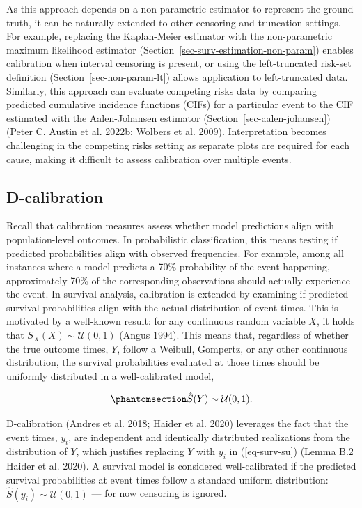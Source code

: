 \documentclass[
  letterpaper,
  krantz2]{style/krantz}
\begin{document}
As this approach depends on a non-parametric estimator to represent the
ground truth, it can be naturally extended to other censoring and
truncation settings. For example, replacing the Kaplan-Meier estimator
with the non-parametric maximum likelihood estimator
(Section~\ref{sec-surv-estimation-non-param}) enables calibration when
interval censoring is present, or using the left-truncated risk-set
definition (Section~\ref{sec-non-param-lt}) allows application to
left-truncated data. Similarly, this approach can
evaluate competing risks data by comparing
predicted cumulative incidence
functions (CIFs) for a particular
event to the CIF estimated with the Aalen-Johansen
estimator
(Section~\ref{sec-aalen-johansen}) (Peter C. Austin et al. 2022b;
Wolbers et al. 2009). Interpretation becomes challenging in the
competing risks setting as separate plots are required for each cause,
making it difficult to assess calibration over multiple events.

\subsection{D-calibration}\label{sec-dcalib}

Recall that calibration measures assess whether model predictions align
with population-level outcomes. In
probabilistic classification, this means testing if predicted
probabilities align with observed frequencies. For example, among all
instances where a model predicts a 70\% probability of the event
happening, approximately 70\% of the corresponding observations should
actually experience the event. In survival analysis, calibration is
extended by examining if predicted survival probabilities align with the
actual distribution of event times. This is motivated by a well-known
result: for any continuous random variable \(X\), it holds that
\(S_X(X) \sim \mathcal{U}(0,1)\) (Angus 1994). This means that,
regardless of whether the true outcome times, \(Y\), follow a Weibull,
Gompertz, or any other continuous distribution, the survival
probabilities evaluated at those times should be uniformly distributed
in a well-calibrated model,

\begin{equation}\phantomsection\label{eq-surv-su}{
\hat{S}(Y) \sim \mathcal{U}(0,1).
}\end{equation}

D-calibration (Andres et al. 2018; Haider et al. 2020) leverages the
fact that the event times, \(y_i\), are independent and identically
distributed realizations from the distribution of \(Y\), which justifies
replacing \(Y\) with \(y_i\) in (\ref{eq-surv-su}) (Lemma B.2 Haider et
al. 2020). A survival model is considered well-calibrated if the
predicted survival probabilities at event times follow a standard
uniform distribution: \(\hat{S}(y_i) \sim \mathcal{U}(0,1)\) --- for now
censoring is ignored.
\end{document}
